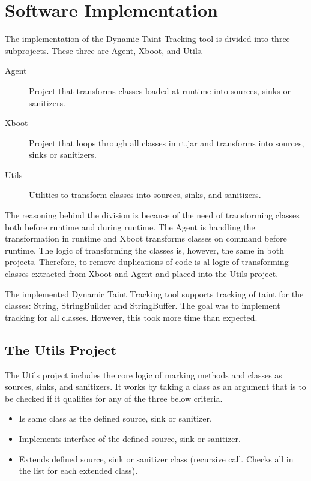 \section{Software Implementation}
\label{SoftwareArchitecture}
The implementation of the Dynamic Taint Tracking tool is divided into three subprojects. These three are Agent, Xboot, and Utils. 

\hfill
\begin{description}
    \item[Agent] Project that transforms classes loaded at runtime into sources, sinks or sanitizers.
    \item[Xboot] Project that loops through all classes in rt.jar and transforms into sources, sinks or sanitizers.
    \item[Utils] Utilities to transform classes into sources, sinks, and sanitizers. 
\end{description}
\hfill

The reasoning behind the division is because of the need of transforming classes both before runtime and during runtime. The Agent is handling the transformation in runtime and Xboot transforms classes on command before runtime. The logic of transforming the classes is, however, the same in both projects. Therefore, to remove duplications of code is al logic of transforming classes extracted from Xboot and Agent and placed into the Utils project.

The implemented Dynamic Taint Tracking tool supports tracking of taint for the classes: String, StringBuilder and StringBuffer. The goal was to implement tracking for all classes. However, this took more time than expected.



\subsection{The Utils Project}
The Utils project includes the core logic of marking methods and classes as sources, sinks, and sanitizers. It works by taking a class as an argument that is to be checked if it qualifies for any of the three below criteria.

\hfill
\begin{itemize}
    \item Is same class as the defined source, sink or sanitizer.
    \item Implements interface of the defined source, sink or sanitizer.
    \item Extends defined source, sink or sanitizer class (recursive call. Checks all in the list for each extended class). 
\end{itemize}
\hfill

